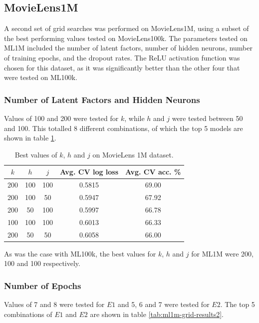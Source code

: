 \subsection{MovieLens1M}
A second set of grid searches was performed on MovieLens1M, using a subset of the best performing values tested on MovieLens100k. The parameters tested on ML1M included the number of latent factors, number of hidden neurons, number of training epochs, and the dropout rates. The ReLU activation function was chosen for this dataset, as it was significantly better than the other four that were tested on ML100k.

\subsubsection{Number of Latent Factors and Hidden Neurons}
Values of 100 and 200 were tested for $k$, while $h$ and $j$ were tested between 50 and 100. This totalled 8 different combinations, of which the top 5 models are shown in table \ref{tab:ml1m-grid-results1}.

\begin{table}[H]
\centering
\begin{tabular}{c | c | c | c | c}
\toprule
\textbf{$k$} & \textbf{$h$} & \textbf{$j$} & \textbf{Avg. CV log loss} & \textbf{Avg. CV acc.} \% \\
\midrule
200 & 100 & 100 & 0.5815 & 69.00 \\
\midrule
200 & 100 & 50 & 0.5947 & 67.92 \\
\midrule
200 & 50 & 100 & 0.5997 & 66.78 \\
\midrule
100 & 100 & 100 & 0.6013 & 66.33 \\
\midrule
200 & 50 & 50 & 0.6058 & 66.00 \\
\bottomrule
\end{tabular}
\caption[MovieLens 1M grid search results -- number of nodes]{Best values of $k$, $h$ and $j$ on MovieLens 1M dataset.}
\label{tab:ml1m-grid-results1}
\end{table}

As was the case with ML100k, the best values for $k$, $h$ and $j$ for ML1M were 200, 100 and 100 respectively.

\subsubsection{Number of Epochs}
Values of 7 and 8 were tested for $E1$ and 5, 6 and 7 were tested for $E2$. The top 5 combinations of $E1$ and $E2$ are shown in table \ref{tab:ml1m-grid-results2}.

